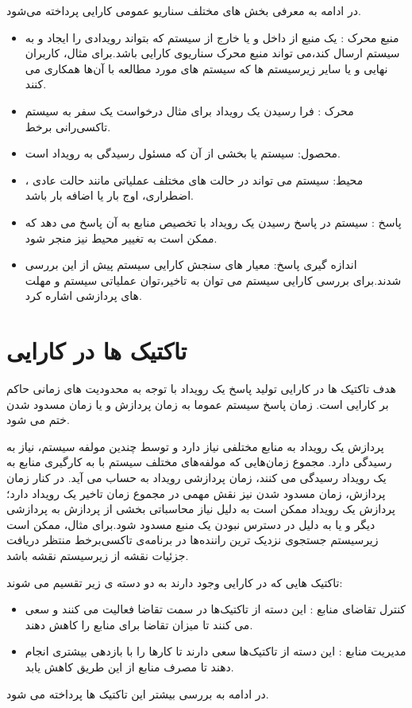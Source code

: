در ادامه به معرفی بخش های مختلف سناریو عمومی کارایی پرداخته می‌شود.
\begin{itemize}
\item
منبع محرک :
یک منبع از داخل و یا خارج از سیستم که بتواند رویدادی را ایجاد و به سیستم ارسال کند،‌می تواند منبع محرک سناریوی کارایی باشد.برای مثال، کاربران نهایی و یا سایر زیرسیستم ها که سیستم های مورد مطالعه با آن‌ها همکاری می کنند.
\item
محرک : 
فرا رسیدن یک رویداد برای مثال درخواست یک سفر به سیستم تاکسی‌رانی برخط.
\item
محصول: سیستم یا بخشی از آن که مسئول رسیدگی به رویداد است.
\item
محیط:
سیستم می تواند در حالت های مختلف عملیاتی مانند حالت عادی ، اضطراری، اوج بار یا اضافه بار باشد.
\item
پاسخ :
سیستم در پاسخ رسیدن یک رویداد با تخصیص منابع به آن پاسخ می دهد که ممکن است به تغییر محیط نیز منجر شود.
\item
اندازه گیری پاسخ:
معیار های سنجش کارایی سیستم پیش از این بررسی شدند.برای بررسی کارایی سیستم می توان به تاخیر،‌توان عملیاتی سیستم و مهلت های پردازشی اشاره کرد.
\end{itemize}

\section{تاکتیک ها در کارایی}
هدف تاکتیک ها در کارایی تولید پاسخ یک رویداد با توجه به محدودیت های زمانی حاکم بر کارایی است. زمان پاسخ سیستم عموما به زمان پردازش و یا زمان مسدود شدن  ختم می شود.

پردازش یک رویداد به منابع مختلفی نیاز دارد و توسط چندین مولفه سیستم، نیاز به رسیدگی دارد. مجموع زمان‌هایی که مولفه‌های مختلف سیستم با به کار‌گیری منابع به یک رویداد رسیدگی می کنند،‌ زمان پردازشی رویداد به حساب می آید. در کنار زمان پردازش، زمان مسدود شدن نیز نقش مهمی در مجموع زمان تاخیر یک رویداد دارد؛ پردازش یک رویداد ممکن است به دلیل نیاز محاسباتی بخشی از پردازش به پردازشی دیگر و یا به دلیل در دسترس نبودن یک منبع مسدود شود.برای مثال، ممکن است زیرسیستم جستجوی نزدیک ترین راننده‌ها در برنامه‌ی تاکسی‌برخط منتظر دریافت جزئیات نقشه از زیرسیستم نقشه باشد.

تاکتیک هایی که در کارایی وجود دارند به دو دسته ی زیر تقسیم می شوند:
\begin{itemize}
\item
کنترل تقاضای منابع : این دسته از تاکتیک‌ها در سمت تقاضا فعالیت می کنند و سعی می کنند تا میزان تقاضا برای منابع را کاهش دهند.
\item
مدیریت منابع : این دسته از تاکتیک‌ها سعی دارند تا کار‌ها را با بازدهی بیشتری انجام دهند تا مصرف منابع از این طریق کاهش یابد.
\end{itemize}
در ادامه به بررسی بیشتر این تاکتیک ها پرداخته می شود.
